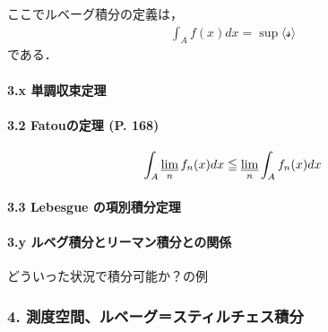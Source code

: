 \documentclass[letterpaper,10pt,english]{sphinxmanual}
\begin{document}
\sphinxAtStartPar
ここでルベーグ積分の定義は，
\begin{equation*}
\begin{split}\begin{equation}
\int_{A} f(x) d x=\sup \langle \mathcal{s}\rangle
\end{equation}\end{split}
\end{equation*}
\sphinxAtStartPar
である．


\paragraph{3.x 単調収束定理}
\label{\detokenize{src/stochasticcalculus/2020-03-16-lebesgue:x}}

\paragraph{3.2 Fatouの定理 (P. 168)}
\label{\detokenize{src/stochasticcalculus/2020-03-16-lebesgue:fatou-p-168}}\begin{equation*}
\begin{split}\begin{equation}
\int_{A} \displaystyle \varliminf_{n} f_{n} (x) dx \leqq \displaystyle \varliminf_{n} \int_{A} f_{n}(x) dx
\end{equation}\end{split}
\end{equation*}

\paragraph{3.3 Lebesgue の項別積分定理}
\label{\detokenize{src/stochasticcalculus/2020-03-16-lebesgue:lebesgue}}

\paragraph{3.y ルベグ積分とリーマン積分との関係}
\label{\detokenize{src/stochasticcalculus/2020-03-16-lebesgue:y}}
\sphinxAtStartPar
どういった状況で積分可能か？の例


\subsubsection{4. 測度空間、ルベーグ＝スティルチェス積分}
\label{\detokenize{src/stochasticcalculus/2020-03-16-lebesgue:id12}}
\sphinxAtStartPar
{\hyperref[\detokenize{7B_7B_20site.baseurl_20_7D_7D/Black-Scholes::doc}]{}}
\end{document}
